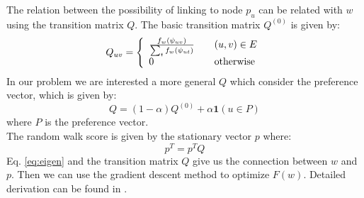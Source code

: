 \documentclass{article} %
\begin{document}
	The relation between the possibility of linking to node $p_u$ can be related with $w$ using the transition matrix $Q$. The basic transition matrix $Q^{(0)}$ is given by:
\[
  Q_{uv} = \left\{ 
  \begin{array}{l l}
    \frac{f_w(\psi_{uv})}{\sum_t f_w(\psi_{ut})} & \quad (u,v)\in E\\
    0 & \quad \text{otherwise}\\
  \end{array} \right.
\]
	In our problem we are interested a more general $Q$ which consider the preference vector, which is given by:
\begin{equation}
Q = (1 - \alpha) Q^{(0)} + \alpha \textbf{1}(u \in P)
\end{equation}
where $P$ is the preference vector. \\
The random walk score is given by the stationary vector $p$ where:
\begin{equation}
\label{eq:eigen}
p^T = p^TQ
\end{equation} 
	Eq. \ref{eq:eigen} and the transition matrix $Q$ give us the connection between $w$ and $p$. Then we can use the gradient descent method to optimize $F(w)$. Detailed derivation can be found in \cite{Backstrom:2011:SRW:1935826.1935914}.  
\end{document}

